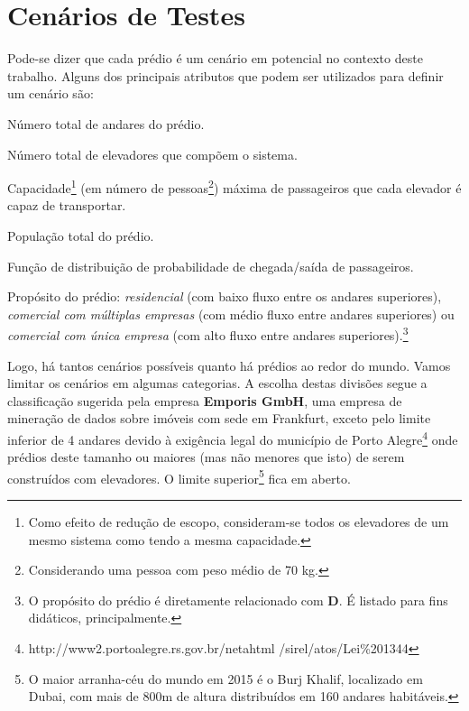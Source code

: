 \section{\label{section:scenarios}Cenários de Testes}

Pode-se dizer que cada prédio é um cenário em potencial no contexto deste
trabalho. Alguns dos principais atributos que podem ser utilizados para definir
um cenário são:

\begin{description}[leftmargin=!,labelwidth=\widthof{\bfseries Pu}]
  \item[F]
  Número total de andares do prédio.
  \item[E]
  Número total de elevadores que compõem o sistema.
  \item[C]
  Capacidade\footnote{Como efeito de redução de escopo, consideram-se todos os
  elevadores de um mesmo sistema como tendo a mesma capacidade.} (em número de
  pessoas\footnote{Considerando uma pessoa com peso médio de 70 kg.}) máxima de
  passageiros que cada elevador é capaz de transportar.
  \item[P]
  População total do prédio.
  \item[D]
  Função de distribuição de probabilidade de chegada/saída de passageiros.
  \item[Pu]
  Propósito do prédio: \textit{residencial} (com baixo fluxo entre os andares superiores), \textit{comercial com múltiplas empresas} (com médio fluxo entre andares superiores) ou \textit{comercial
    com única empresa} (com alto fluxo entre andares superiores).\footnote{O
    propósito do prédio é diretamente relacionado com \textbf{D}. É listado para
  fins didáticos, principalmente.}
\end{description}

Logo, há tantos cenários possíveis quanto há prédios ao redor do mundo. Vamos
limitar os cenários em algumas categorias. A escolha destas divisões segue a
classificação\cite{Emporis15} sugerida pela empresa \textbf{Emporis GmbH}, uma
empresa de mineração de dados sobre imóveis com sede em Frankfurt, exceto pelo
limite inferior de 4 andares devido à exigência legal do município de Porto
Alegre\footnote{http://www2.portoalegre.rs.gov.br/netahtml
/sirel/atos/Lei\%201344} onde prédios deste tamanho ou maiores (mas não menores
que isto) de serem construídos com elevadores. O limite superior\footnote{O
maior arranha-céu do mundo em 2015 é o Burj Khalif, localizado em Dubai, com
mais de 800m de altura distribuídos em 160 andares habitáveis.} fica em aberto.

